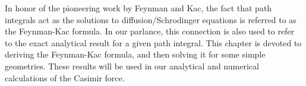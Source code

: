     In honor of the pioneering work by Feynman and Kac, the fact that path integrals
    act as the solutions to diffusion/Schrodinger equations is referred to as the Feynman-Kac 
    formula.  In our parlance, this connection is also used to refer to the exact analytical
    result for a given path integral.  
    This chapter is devoted to deriving the Feynman-Kac formula, and then solving
    it for some simple geometries.  These results will be used in our analytical and numerical
    calculations of the Casimir force.  

    

